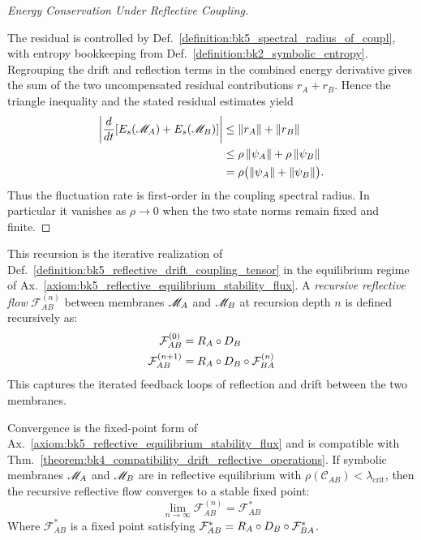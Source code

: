 \begin{proof}[Energy Conservation Under Reflective Coupling]
\label{proof:bk5_energy_conservation_under_reflective_coupling}
\leavevmode

The residual is controlled by
Def.~\ref{definition:bk5_spectral_radius_of_coupl}, with entropy bookkeeping
from Def.~\ref{definition:bk2_symbolic_entropy}.  Regrouping the drift and
reflection terms in the combined energy derivative gives the sum of the two
uncompensated residual contributions $r_A+r_B$.  Hence the triangle inequality
and the stated residual estimates yield
\[
\begin{aligned}
\left|\frac{d}{dt}[E_s(\mathscr{M}_A)+E_s(\mathscr{M}_B)]\right|
&\le \|r_A\|+\|r_B\| \\
&\le \rho\,\|\psi_A\|+\rho\,\|\psi_B\| \\
&=\rho\bigl(\|\psi_A\|+\|\psi_B\|\bigr).
\end{aligned}
\]
Thus the fluctuation rate is first-order in the coupling spectral radius.  In
particular it vanishes as $\rho\to0$ when the two state norms remain fixed and
finite.
\end{proof}
\begin{definition} \label{definition:bk5_recursive_reflective_flow}
This recursion is the iterative realization of Def.~\ref{definition:bk5_reflective_drift_coupling_tensor} in the equilibrium regime of Ax.~\ref{axiom:bk5_reflective_equilibrium_stability_flux}.
A \emph{recursive reflective flow} $\mathcal{F}_{AB}^{(n)}$ between membranes $\mathscr{M}_A$ and $\mathscr{M}_B$ at recursion depth $n$ is defined recursively as:
\begin{align}
\mathcal{F}_{AB}^{(0)} &= R_A \circ D_B\\
\mathcal{F}_{AB}^{(n+1)} &= R_A \circ D_B \circ \mathcal{F}_{BA}^{(n)}
\end{align}
This captures the iterated feedback loops of reflection and drift between the two membranes.
\end{definition}
\begin{lemma}
\label{lemma:bk5_recursive_flow_convergence}
Convergence is the fixed-point form of Ax.~\ref{axiom:bk5_reflective_equilibrium_stability_flux} and is compatible with Thm.~\ref{theorem:bk4_compatibility_drift_reflective_operations}.
If symbolic membranes $\mathscr{M}_A$ and $\mathscr{M}_B$ are in reflective equilibrium with $\rho(\mathcal{C}_{AB}) < \lambda_{\text{crit}}$, then the recursive reflective flow converges to a stable fixed point:
\begin{equation}
\lim_{n \to \infty} \mathcal{F}_{AB}^{(n)} = \mathcal{F}_{AB}^*
\end{equation}
Where $\mathcal{F}_{AB}^*$ is a fixed point satisfying $\mathcal{F}_{AB}^* = R_A \circ D_B \circ \mathcal{F}_{BA}^*$.
\end{lemma}
